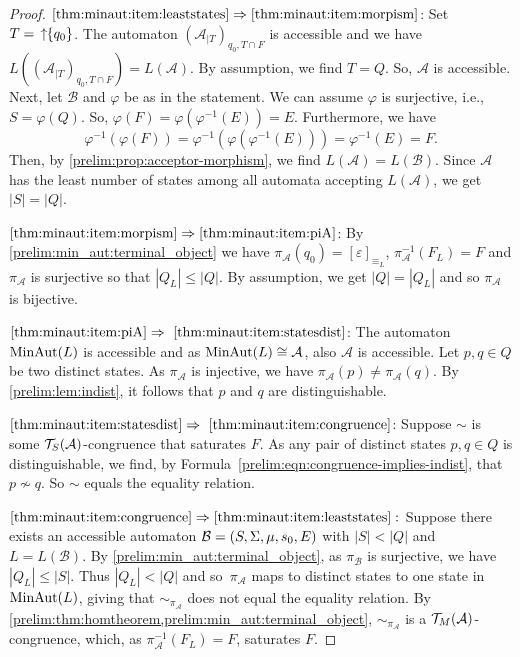 \begin{proof} $\ref{thm:minaut:item:leaststates} \Rightarrow \ref{thm:minaut:item:morpism}$:
	Set $T = \,\mbox{\ensuremath{\displaystyle \uparrow \!\!\{q_0\}}}$.
	The automaton $( \mathcal A_{|T} )_{q_0, T \cap F}$ is accessible 
	and we have $L(( \mathcal A_{|T} )_{q_0, T \cap F}) = L(\mathcal A)$.
	By assumption, we find $T = Q$. So, $\mathcal A$ is accessible.
	Next, let $\mathcal B$ and $\varphi$ be as in the statement.
	We can assume $\varphi$ is surjective, i.e., $S = \varphi(Q)$.
	So, $\varphi(F) = \varphi(\varphi^{-1}(E)) = E$.
	Furthermore, we have
	\[
	\varphi^{-1}(\varphi(F)) = \varphi^{-1}(\varphi(\varphi^{-1}(E))) = \varphi^{-1}(E) = F.
	\]
	Then, by \cref{prelim:prop:acceptor-morphism},
	we find $L(\mathcal A) = L(\mathcal B)$.
	Since $\mathcal A$ has the least number of states
	among all automata accepting $L(\mathcal A)$,
	we get $|S| = |Q|$.

$\ref{thm:minaut:item:morpism} \Rightarrow \ref{thm:minaut:item:piA}$: 
By \cref{prelim:min_aut:terminal_object}
we have  $\pi_{\mathcal A}(q_0) = [\varepsilon]_{\equiv_L}$, $\pi_{\mathcal A}^{-1}(F_L) = F$
and $\pi_{\mathcal A}$ is surjective so that $|Q_L| \le |Q|$.
By assumption, we get $|Q| = |Q_L|$
and so $\pi_{\mathcal A}$ is bijective.
	
$\ref{thm:minaut:item:piA} \Rightarrow~\ref{thm:minaut:item:statesdist}$: The automaton
$\operatorname{MinAut}(L)$ is accessible and as $\operatorname{MinAut}(L) \cong \mathcal A$,
also $\mathcal A$ is accessible.
Let $p,q \in Q$ be two distinct states.
As $\pi_{\mathcal A}$ is injective, we have $\pi_{\mathcal A}(p) \ne \pi_{\mathcal A}(q)$.
By \cref{prelim:lem:indist},
it follows that $p$ and $q$ are distinguishable.

$\ref{thm:minaut:item:statesdist} \Rightarrow~\ref{thm:minaut:item:congruence}$: Suppose $\sim$ 
is some $\mathcal T_S(\mathcal A)$-congruence that saturates $F$.
As any pair of distinct states $p,q \in Q$ is distinguishable,
we find, by Formula~\eqref{prelim:eqn:congruence-implies-indist},
that $p \not\sim q$. So $\sim$ equals the equality relation.

$\ref{thm:minaut:item:congruence} \Rightarrow \ref{thm:minaut:item:leaststates}:$ Suppose there exists an accessible 
automaton $\mathcal B = (S, \Sigma, \mu, s_0, E)$ 
with $|S| < |Q|$ and $L = L(\mathcal B)$.
By \cref{prelim:min_aut:terminal_object}, as $\pi_{\mathcal B}$ is surjective, 
we have $|Q_L| \le |S|$. 
Thus $|Q_L| < |Q|$
and so~$\pi_{\mathcal A}$ maps to distinct states to one state in $\operatorname{MinAut}(L)$,
giving that $\sim_{\pi_{\mathcal A}}$ does not equal the equality relation.
By \cref{prelim:thm:homtheorem,prelim:min_aut:terminal_object}, $\sim_{\pi_{\mathcal A}}$
is a $\mathcal T_M(\mathcal A)$-congruence, which, as $\pi_{\mathcal A}^{-1}(F_L) = F$,
saturates $F$.
\end{proof}

